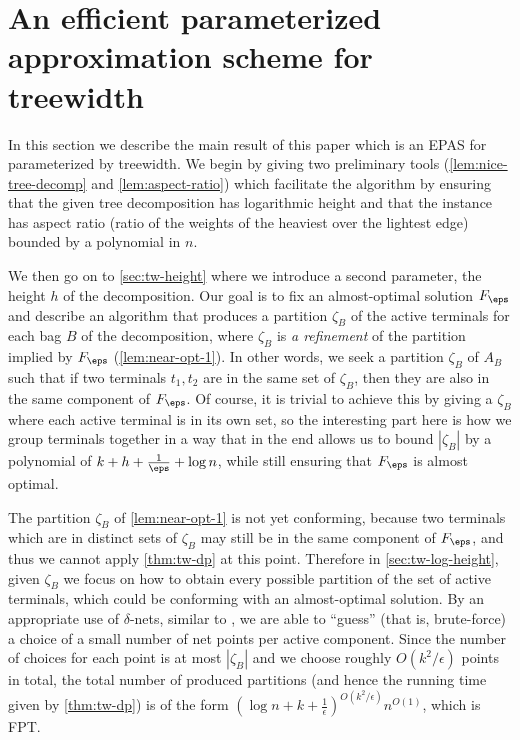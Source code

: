 \section{An efficient parameterized approximation scheme for treewidth}\label{sec:tw}

In this section we describe the main result of this paper which is an EPAS for
\SF parameterized by treewidth. We begin by giving two preliminary tools
(\autoref{lem:nice-tree-decomp} and \autoref{lem:aspect-ratio}) which
facilitate the algorithm by ensuring that the given tree decomposition has
logarithmic height and that the instance has aspect ratio (ratio of the weights
of the heaviest over the lightest edge) bounded by a polynomial in $n$.

We then go on to \autoref{sec:tw-height} where we introduce a second parameter,
the height $h$ of the decomposition. Our goal is to fix an almost-optimal
solution $F_\eps$ and describe an algorithm that produces a partition $\zeta_B$ of the active terminals
for each bag $B$ of the decomposition, where $\zeta_B$ is
\emph{a refinement} of the partition implied by $F_\eps$
(\autoref{lem:near-opt-1}). In other words, we seek a partition $\zeta_B$ of
$A_B$ such that if two terminals $t_1,t_2$ are in the same set of $\zeta_B$,
then they are also in the same component of $F_\eps$. Of course, it is trivial
to achieve this by giving a $\zeta_B$ where each active terminal is in its own
set, so the interesting part here is how we group terminals together in a way
that in the end allows us to bound $|\zeta_B|$ by a polynomial of
$k+h+\frac{1}{\eps}+\log n$, while still ensuring that $F_\eps$ is almost
optimal. 

The partition $\zeta_B$ of \autoref{lem:near-opt-1} is not yet conforming,
because two terminals which are in distinct sets of $\zeta_B$ may still be in
the same component of $F_\eps$, and thus we cannot apply \cref{thm:tw-dp} at this point. 
Therefore in \autoref{sec:tw-log-height}, given $\zeta_B$ we
focus on how to obtain every possible partition of the set of
active terminals, which could be conforming with an almost-optimal solution. By
an appropriate use of $\delta$-nets, similar to \cite{bateni2011approximation},
we are able to ``guess'' (that is, brute-force) a choice of a small number of
net points per active component. Since the number of choices for each point is
at most $|\zeta_B|$ and we choose roughly $O(k^2/\epsilon)$ points in total, the
total number of produced partitions (and hence the running time given by
\autoref{thm:tw-dp}) is of the form $(\log n + k
+\frac{1}{\epsilon})^{O(k^2/\epsilon)}n^{O(1)}$, which is FPT.

